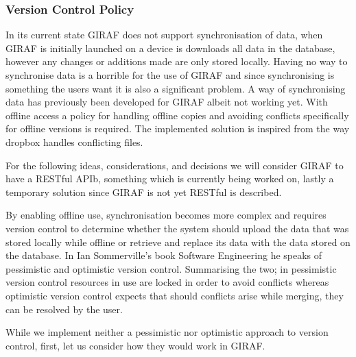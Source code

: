 \subsubsection*{Version Control Policy}
In its current state GIRAF does not support synchronisation of data, when GIRAF is initially launched on a device is downloads all data in the database, however any changes or additions made are only stored locally.
Having no way to synchronise data is a horrible for the use of GIRAF and since synchronising is something the users want it is also a significant problem.
A way of synchronising data has previously been developed for GIRAF albeit not working yet.
With offline access a policy for handling offline copies and avoiding conflicts specifically for offline versions is required.
The implemented solution is inspired from the way dropbox handles conflicting files.

\bigskip
For the following ideas, considerations, and decisions we will consider GIRAF to have a RESTful APIb, something which is currently being worked on, lastly a temporary solution since GIRAF is not yet RESTful is described.

By enabling offline use, synchronisation becomes more complex and requires version control to determine whether the system should upload the data that was stored locally while offline or retrieve and replace its data with the data stored on the database.
In Ian Sommerville's book Software Engineering \citep{SEBOOK} he speaks of pessimistic and optimistic version control.
Summarising the two; in pessimistic version control resources in use are locked in order to avoid conflicts whereas optimistic version control expects that should conflicts arise while merging, they can be resolved by the user.

\bigskip  \noindent
While we implement neither a pessimistic nor optimistic approach to version control, first, let us consider how they would work in GIRAF.

